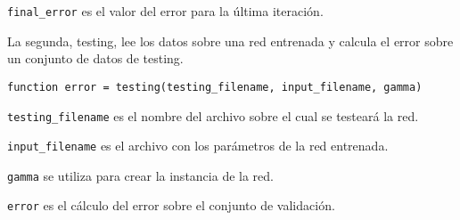\documentclass[informe.tex]{subfiles}
\begin{document}
    \smallskip
    \verb|final_error| es el valor del error para la última iteración.
    
    \bigskip
    
    La segunda, testing, lee los datos sobre una red entrenada y calcula el error sobre un conjunto de datos de testing.
    
    \verb|function error = testing(testing_filename, input_filename, gamma)|
    
    \smallskip
    \verb|testing_filename| es el nombre del archivo sobre el cual se testeará la red.
    
    \smallskip
    \verb|input_filename| es el archivo con los parámetros de la red entrenada.
    
    \smallskip
    \verb|gamma| se utiliza para crear la instancia de la red.
    
    \smallskip
    \verb|error| es el cálculo del error sobre el conjunto de validación.
    
\end{document}
